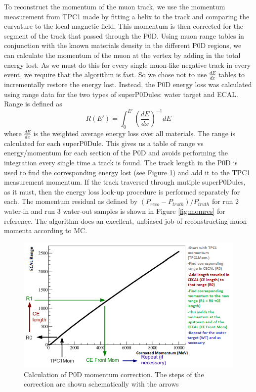 To reconstruct the momentum of the muon track, we use the momentum measurement from TPC1 made by fitting a helix to the track and comparing the curvature to the local magnetic field. This momentum is then corrected for the segment of the track that passed through the P0D. Using muon range tables in conjunction with the known materials density in the different P0D regions, we can calculate the momentum of the muon at the vertex by adding in the total energy lost. As we must do this for every single muon-like negative track in every event, we require that the algorithm is fast. So we chose not to use $\frac{dE}{dx}$ tables to incrementally restore the energy lost. Instead, the P0D energy loss was calculated using range data for the two types of superP0Dules: water target and ECAL. Range is defined as
\begin{equation}
R(E') = \int^{E'}_{0} \left(\frac{dE}{dx}\right)^{-1} dE
\end{equation}
where $\frac{dE}{dx}$ is the weighted average energy loss over all materials. The range is calculated for each superP0Dule. This gives us a table of range vs energy/momentum for each section of the P0D and avoids performing the integration every single time a track is found. The track length in the P0D is used to find the corresponding energy lost (see Figure \ref{fig:eloss}) and add it to the TPC1 measurement momentum. If the track traversed through mutiple superP0Dules, as it must, then the energy loss look-up procedure is performed separately for each. The momentum residual as defined by $(P_{reco}-P_{truth})/P_{truth}$ for run 2 water-in and run 3 water-out samples is shown in Figure \ref{fig:momres} for reference. The algorithm does an excellent, unbiased job of reconstructing muon momenta according to MC.

\begin{figure}
\centering
\includegraphics[width=5.5in]{Figures/eLossCalc1.png}
\caption{Calculation of P0D momentum correction. The steps of the correction
are shown schematically with the arrows} 
\label{fig:eloss}
\end{figure}

